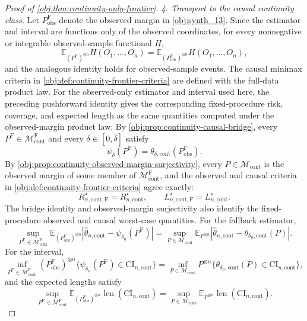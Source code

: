 \documentclass[11pt]{article}
\begin{document}
\begin{proof}[Proof of \cref{obj:thm:continuity-only-frontier}]
\emph{4. Transport to the causal continuity class.}
Let \(P^{\mathrm F}_{\mathrm{obs}}\) denote the observed margin in \cref{obj:synth_13}.  Since the estimator and interval are functions only of the observed coordinates,
for every nonnegative or integrable observed-sample functional \(H\),
\[
\mathbb E_{(P^{\mathrm F})^{\otimes n}}H(O_1,\ldots,O_n)
=
\mathbb E_{(P^{\mathrm F}_{\mathrm{obs}})^{\otimes n}}H(O_1,\ldots,O_n),
\]
and the analogous identity holds for observed-sample events.  The causal minimax criteria in
\cref{obj:def:continuity-frontier-criteria} are defined with the full-data product law.  For the observed-only estimator and interval used here, the preceding pushforward identity gives the corresponding fixed-procedure risk, coverage, and expected length as the same quantities computed under the observed-margin product law.  By \cref{obj:prop:continuity-causal-bridge}, every
\(P^{\mathrm F}\in\mathcal M_{\mathrm{cont}}^{\mathrm F}\) and every
\(\delta\in[0,\bar\delta]\) satisfy
\[
\psi_\delta(P^{\mathrm F})
=
\theta_{\delta,\mathrm{cont}}(P^{\mathrm F}_{\mathrm{obs}}).
\]
By \cref{obj:prop:continuity-observed-margin-surjectivity}, every
\(P\in\mathcal M_{\mathrm{cont}}\) is the observed margin of some member of
\(\mathcal M_{\mathrm{cont}}^{\mathrm F}\), and the observed and causal criteria in
\cref{obj:def:continuity-frontier-criteria} agree exactly:
\[
R_{n,\mathrm{cont},\mathrm F}^\star=R_{n,\mathrm{cont}}^\star,
\qquad
L_{n,\mathrm{cont},\mathrm F}^\star=L_{n,\mathrm{cont}}^\star .
\]
The bridge identity and observed-margin surjectivity also identify the fixed-procedure observed and causal worst-case quantities.  For the fallback estimator,
\[
\sup_{P^{\mathrm F}\in\mathcal M_{\mathrm{cont}}^{\mathrm F}}
\mathbb E_{(P^{\mathrm F}_{\mathrm{obs}})^{\otimes n}}
\left|\widehat\theta_{n,\mathrm{cont}}-\psi_{\delta_n}(P^{\mathrm F})\right|
=
\sup_{P\in\mathcal M_{\mathrm{cont}}}
\mathbb E_{P^{\otimes n}}
\left|\widehat\theta_{n,\mathrm{cont}}-\theta_{\delta_n,\mathrm{cont}}(P)\right|.
\]
For the interval,
\[
\inf_{P^{\mathrm F}\in\mathcal M_{\mathrm{cont}}^{\mathrm F}}
(P^{\mathrm F}_{\mathrm{obs}})^{\otimes n}
\{\psi_{\delta_n}(P^{\mathrm F})\in\mathrm{CI}_{n,\mathrm{cont}}\}
=
\inf_{P\in\mathcal M_{\mathrm{cont}}}
P^{\otimes n}
\{\theta_{\delta_n,\mathrm{cont}}(P)\in\mathrm{CI}_{n,\mathrm{cont}}\},
\]
and the expected lengths satisfy
\[
\sup_{P^{\mathrm F}\in\mathcal M_{\mathrm{cont}}^{\mathrm F}}
\mathbb E_{(P^{\mathrm F}_{\mathrm{obs}})^{\otimes n}}
\operatorname{len}(\mathrm{CI}_{n,\mathrm{cont}})
=
\sup_{P\in\mathcal M_{\mathrm{cont}}}
\mathbb E_{P^{\otimes n}}
\operatorname{len}(\mathrm{CI}_{n,\mathrm{cont}}).
\]


\end{proof}
\end{document}
